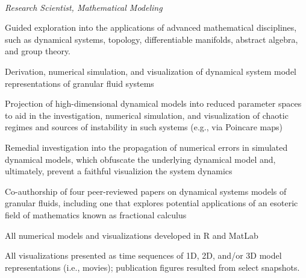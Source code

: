 \\  
\vspace{-0.8em}
\textit{Research Scientist, Mathematical Modeling} 
\begin{itemize*}
  \item Guided exploration into the applications of advanced mathematical
    disciplines, such as dynamical systems, topology, differentiable
    manifolds, abstract algebra, and group theory.
  \item Derivation, numerical simulation, and visualization of
    dynamical system model representations of granular fluid systems
  \item Projection of high-dimensional dynamical models into
    reduced parameter spaces to aid in the investigation, numerical simulation,
    and visualization of chaotic regimes and sources of instability
    in such systems (e.g., via Poincare maps)
  \item Remedial investigation into the propagation of numerical errors in
    simulated dynamical models, which obfuscate the underlying dynamical model
    and, ultimately, prevent a faithful visualizion the system dynamics
  \item Co-authorship of four peer-reviewed papers on dynamical systems
    models of granular fluids, including one that explores potential
    applications of an esoteric field of mathematics known as fractional
    calculus
  \item All numerical models and visualizations developed in R and
    MatLab
  \item All visualizations presented as time sequences of 1D, 2D,
    and/or 3D model representations (i.e., movies); publication figures
    resulted from select snapshots.
\end{itemize*}




